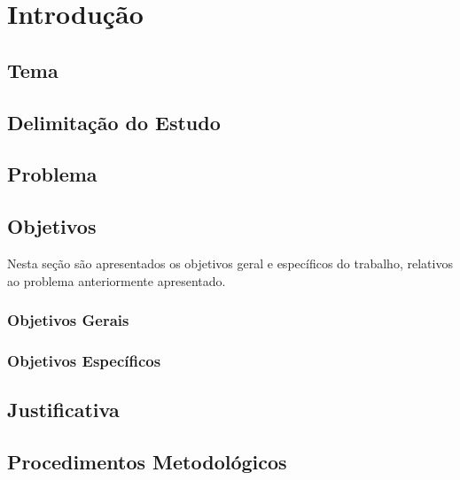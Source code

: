 
\chapter{Introdução}
\label{chap:introducao}



    \section{Tema}



    \section{Delimitação do Estudo}



    \section{Problema}



    \section{Objetivos}

    Nesta seção são apresentados os objetivos geral e específicos do trabalho, relativos ao problema anteriormente apresentado.

        \subsection{Objetivos Gerais}



        \subsection{Objetivos Específicos}



    \section{Justificativa}



    \section{Procedimentos Metodológicos}



